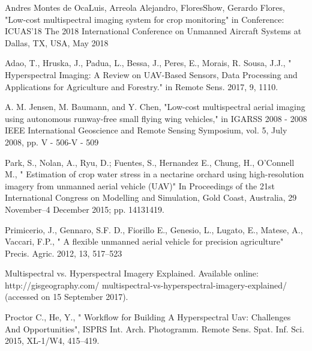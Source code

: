 \begin{thebibliography}{}
Andres Montes de OcaLuis, Arreola Alejandro, FloresShow, Gerardo Flores, "Low-cost multispectral imaging system for crop monitoring" in Conference: ICUAS'18 The 2018 International Conference on Unmanned Aircraft Systems at Dallas, TX, USA, May 2018

Adao, T., Hruska, J., Padua, L., Bessa, J., Peres, E., Morais, R. Sousa, J.J., " Hyperspectral Imaging: A Review on UAV-Based Sensors, Data Processing and Applications for Agriculture and Forestry." in Remote Sens. 2017, 9, 1110. 

A. M. Jensen, M. Baumann, and Y. Chen, "Low-cost multispectral aerial imaging using autonomous runway-free small ﬂying wing vehicles," in IGARSS 2008 - 2008 IEEE International Geoscience and Remote Sensing Symposium, vol. 5, July 2008, pp. V - 506-V - 509

Park, S., Nolan, A., Ryu, D.; Fuentes, S., Hernandez E., Chung, H., O'Connell M., " Estimation of crop water stress in a nectarine orchard using high-resolution imagery from unmanned aerial vehicle (UAV)" In Proceedings of the 21st International Congress on Modelling and Simulation, Gold Coast, Australia, 29 November–4 December 2015; pp. 14131419. 

Primicerio, J., Gennaro, S.F. D., Fiorillo E., Genesio, L., Lugato, E., Matese, A., Vaccari, F.P., " A ﬂexible unmanned aerial vehicle for precision agriculture" Precis. Agric. 2012, 13, 517–523

Multispectral vs. Hyperspectral Imagery Explained. Available online: http://gisgeography.com/ multispectral-vs-hyperspectral-imagery-explained/ (accessed on 15 September 2017). 

Proctor C., He, Y., " Workﬂow for Building A Hyperspectral Uav: Challenges And Opportunities", ISPRS Int. Arch. Photogramm. Remote Sens. Spat. Inf. Sci. 2015, XL-1/W4, 415–419. 

\end{thebibliography}
